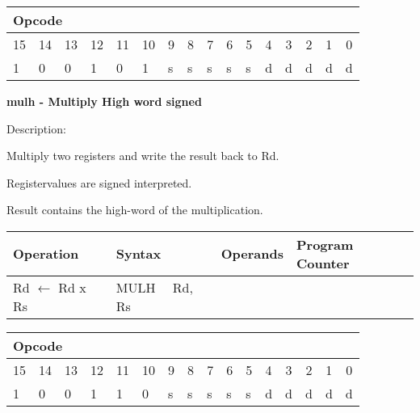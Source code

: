 \documentclass{article}
\begin{document}
\begin{tabular}{|c|c|c|c|c|c|c|c|c|c|c|c|c|c|c|c|}
\hline
\multicolumn{6}{|l|}{Opcode} & \multicolumn{5}{|l|}{} & \multicolumn{5}{|l|}{
} \\ \hline
15 & 14 & 13 & 12 & 11 & 10 & 9 & 8 & 7 & 6 & 5 & 4 & 3 & 2 & 1 & 0 \\ \hline
\multicolumn{1}{|l|}{1} & \multicolumn{1}{|l|}{0} & \multicolumn{1}{|l|}{0}
& \multicolumn{1}{|l|}{1} & \multicolumn{1}{|l|}{0} & \multicolumn{1}{|l|}{1}
& \multicolumn{1}{|l|}{s} & \multicolumn{1}{|l|}{s} & \multicolumn{1}{|l|}{s}
& \multicolumn{1}{|l|}{s} & \multicolumn{1}{|l|}{s} & \multicolumn{1}{|l|}{d}
& \multicolumn{1}{|l|}{d} & \multicolumn{1}{|l|}{d} & \multicolumn{1}{|l|}{d}
& \multicolumn{1}{|l|}{d} \\ \hline
\end{tabular}

\bigskip

\textbf{mulh - Multiply High word signed}

Description:

Multiply two registers and write the result back to Rd.

Registervalues are signed interpreted.

Result contains the high-word of the multiplication.

\begin{tabular}{|l|l|l|l|}
\hline
Operation & Syntax & Operands & Program Counter \\ \hline
Rd $\leftarrow $ Rd x Rs & MULH \ \ Rd, Rs &  &  \\ \hline
\end{tabular}

\begin{tabular}{|c|c|c|c|c|c|c|c|c|c|c|c|c|c|c|c|}
\hline
\multicolumn{6}{|l|}{Opcode} & \multicolumn{5}{|l|}{} & \multicolumn{5}{|l|}{
} \\ \hline
15 & 14 & 13 & 12 & 11 & 10 & 9 & 8 & 7 & 6 & 5 & 4 & 3 & 2 & 1 & 0 \\ \hline
\multicolumn{1}{|l|}{1} & \multicolumn{1}{|l|}{0} & \multicolumn{1}{|l|}{0}
& \multicolumn{1}{|l|}{1} & \multicolumn{1}{|l|}{1} & \multicolumn{1}{|l|}{0}
& \multicolumn{1}{|l|}{s} & \multicolumn{1}{|l|}{s} & \multicolumn{1}{|l|}{s}
& \multicolumn{1}{|l|}{s} & \multicolumn{1}{|l|}{s} & \multicolumn{1}{|l|}{d}
& \multicolumn{1}{|l|}{d} & \multicolumn{1}{|l|}{d} & \multicolumn{1}{|l|}{d}
& \multicolumn{1}{|l|}{d} \\ \hline
\end{tabular}
\end{document}
